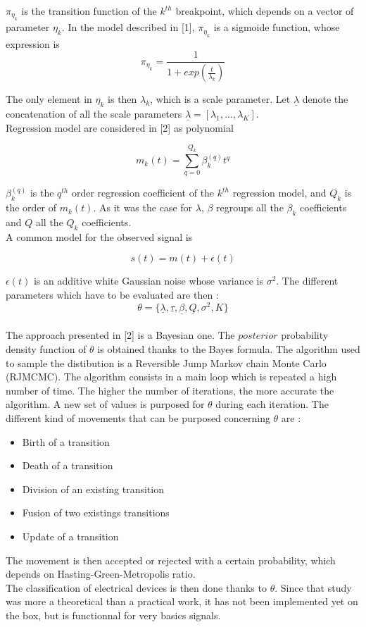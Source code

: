 $\pi_{\eta_{k}}$ is the transition function of the $k^{th}$ breakpoint, which depends on a vector of parameter $\eta_{k}$. In the model described in [1], $\pi_{\eta_{k}}$ is a sigmoide function, whose expression is 
\begin{equation}
\pi_{\eta_{k}} = \frac{1}{1+exp(\frac{t}{\lambda_k})}
\end{equation}

The only element in $\eta_{k}$ is then $\lambda_k$, which is a scale parameter. Let $\underline{\lambda}$ denote the concatenation of all the scale parameters $\underline{\lambda} = [\lambda_1,...,\lambda_K]$.
\\

 Regression model are considered in [2] as polynomial 

\begin{equation}
m_k(t)= \sum_{q=0}^{Q_k} \beta^{(q)} _kt^q
\end{equation}

$\beta^{(q)} _k$ is the $q^{th}$ order regression coefficient of the $k^{th}$ regression model, and $Q_k$ is the order of $m_k(t)$. As it was the case for $\lambda$, $\beta$ regroups all the $\beta_k$ coefficients and $Q$ all the $Q_k$ coefficients.
\\

A common model for the observed signal is 


\begin{equation}
s(t)=m(t) + \epsilon (t)
\end{equation}

$\epsilon (t)$ is an additive white Gaussian noise whose variance is $\sigma^2$. The different parameters which have to be evaluated are then :
\begin{equation}
\theta=\{\underline{\lambda},\underline{\tau},\underline{\beta},\underline{Q},\sigma ^2,K\}
\end{equation}
\\


The approach presented in [2] is a Bayesian one. The $posterior$ probability density function of $\theta$ is obtained thanks to the Bayes formula. The algorithm used to sample the distibution is a Reversible Jump Markov chain Monte Carlo (RJMCMC). The algorithm consists in a main loop which is repeated a high number of time. The higher the number of iterations, the more accurate the algorithm. A new set of values is purposed for $\theta$ during each iteration. The different kind of movements that can be purposed concerning $\theta$ are :
\begin{itemize}
\item Birth of a transition
\item Death of a transition
\item Division of an existing transition
\item Fusion of two existings transitions
\item Update of a transition
\end{itemize}
The movement is then accepted or rejected with a certain probability, which depends on Hasting-Green-Metropolis ratio. 
\\

The classification of electrical devices is then done thanks to $\theta$. Since that study was more a theoretical than a practical work, it has not been implemented yet on the box, but is functionnal for very basics signals.

